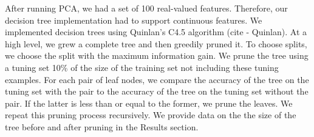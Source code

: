 After running PCA, we had a set of 100 real-valued features. 
Therefore, our decision tree implementation had to support continuous features.
We implemented decision trees using Quinlan's C4.5 algorithm (cite - Quinlan).
At a high level, we grew a complete tree and then greedily pruned it.
To choose splits, we choose the split with the maximum information gain.
We prune the tree using a tuning set 10\% of the size of the training set not including these tuning examples.
For each pair of leaf nodes, we compare the accuracy of the tree on the tuning set with the pair to the accuracy of the tree on the tuning set without the pair.
If the latter is less than or equal to the former, we prune the leaves.
We repeat this pruning process recursively.
We provide data on the the size of the tree before and after pruning in the Results section.

